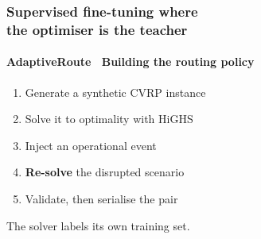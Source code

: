 \documentclass[aspectratio=169,10pt]{beamer}
\newcommand{\cy}[1]{{\color{arCyan2}\bfseries #1}}
\newcommand{\muted}[1]{{\color{arMuted} #1}}
\begin{document}
\begin{frame}
  \frametitle{Supervised fine-tuning where\\ the optimiser is the teacher}
  \framesubtitle{AdaptiveRoute \textperiodcentered\ Building the routing policy}

  \vspace{0.9em}
  \large
  \begin{enumerate}\setlength\itemsep{0.55em}
    \item[\color{arCyan}\bfseries 1.] Generate a synthetic CVRP instance
    \item[\color{arCyan}\bfseries 2.] Solve it to optimality with HiGHS
    \item[\color{arCyan}\bfseries 3.] Inject an operational event
    \item[\color{arCyan}\bfseries 4.] \cy{Re-solve} the disrupted scenario
    \item[\color{arCyan}\bfseries 5.] Validate, then serialise the pair
  \end{enumerate}
  \normalsize

  \vspace{1.6em}
  \centering
  \muted{The solver labels its own training set.}

\end{frame}
\end{document}
